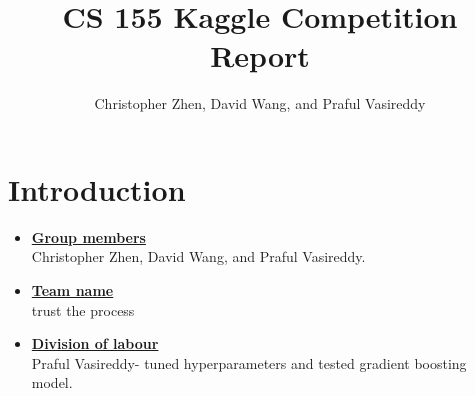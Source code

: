 \documentclass[11pt]{article}
\title{CS 155 Kaggle Competition Report}
\author{Christopher Zhen, David Wang, and Praful Vasireddy}
\newcommand{\boldline}[1]{\underline{\textbf{#1}}}
\begin{document}
	
	\maketitle
	
	\pagestyle{fancy}
	
	
	
	
	
	
	\section{Introduction}
	\medskip
	\begin{itemize}
		
		\item \boldline{Group members} \\
		Christopher Zhen, David Wang, and Praful Vasireddy.
		
		\item \boldline{Team name} \\
		trust the process
		
		\item \boldline{Division of labour} \\
		Praful Vasireddy- tuned hyperparameters and tested gradient boosting model.
		
	\end{itemize}
	
	
	
\end{document}
